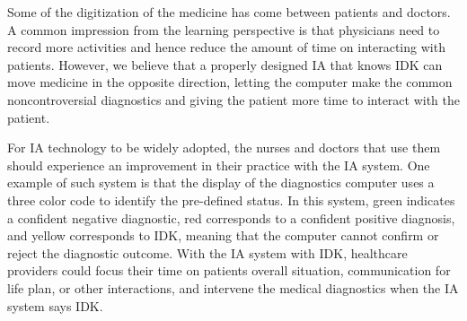 \documentclass[11pt]{pnas-new}
\begin{document}
  Some of the digitization of the medicine has come between patients
  and doctors. {\color{blue}A common impression from the learning perspective is that physicians need to record more activities and hence reduce the amount of time on interacting with patients. However, we} %
  believe that {\color{blue}a properly designed } IA {\color{blue}that knows IDK} can
  move medicine in the opposite direction, letting the computer make
  the common noncontroversial diagnostics and giving the patient more
  time to interact with the patient.


  For IA technology to be widely adopted, the nurses and doctors that
  use them should experience an improvement in their practice {\color{blue}with the IA system. One example of such system is}
  that the display of the diagnostics computer uses a three color code
  to identify {\color{blue}the pre-defined status. In this system,} green indicates a confident
  negative diagnostic, red corresponds to a confident positive
  diagnosis, and yellow corresponds to IDK, meaning that the
  computer cannot confirm or reject the diagnostic outcome. {\color{blue}%
  With the IA system with IDK, healthcare providers could focus their time on patients overall situation, communication for life plan, or other interactions, and intervene the medical diagnostics when the IA system says IDK.}
\end{document}
